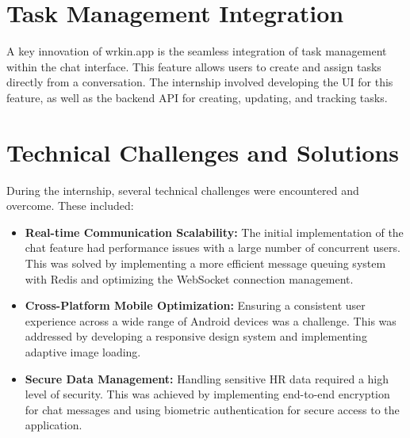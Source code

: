 \section{Task Management Integration}
A key innovation of wrkin.app is the seamless integration of task management within the chat interface. This feature allows users to create and assign tasks directly from a conversation. The internship involved developing the UI for this feature, as well as the backend API for creating, updating, and tracking tasks.

\section{Technical Challenges and Solutions}
During the internship, several technical challenges were encountered and overcome. These included:
\begin{itemize}
    \item \textbf{Real-time Communication Scalability:} The initial implementation of the chat feature had performance issues with a large number of concurrent users. This was solved by implementing a more efficient message queuing system with Redis and optimizing the WebSocket connection management.
    \item \textbf{Cross-Platform Mobile Optimization:} Ensuring a consistent user experience across a wide range of Android devices was a challenge. This was addressed by developing a responsive design system and implementing adaptive image loading.
    \item \textbf{Secure Data Management:} Handling sensitive HR data required a high level of security. This was achieved by implementing end-to-end encryption for chat messages and using biometric authentication for secure access to the application.
\end{itemize}